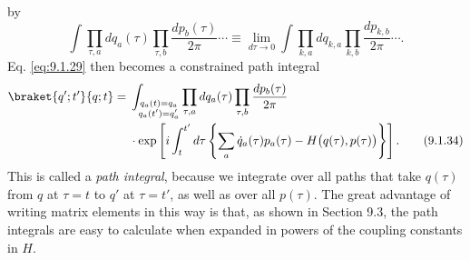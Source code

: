 by
\begin{equation}
  \int\prod_{\tau,a}dq_a(\tau)\prod_{\tau,b}\frac{dp_b(\tau)}{2\pi}\cdots
  \equiv\lim_{d\tau\to0}\int\prod_{k,a}dq_{k,a}
  \prod_{k,b}\frac{dp_{k,b}}{2\pi}\cdots.
  \tag{9.1.33}\label{eq:9.1.33}
\end{equation}
Eq. \eqref{eq:9.1.29} then becomes a constrained path integral
\begin{align}
  \braket{q';t'}{q;t}
  ={}&\int_{\substack{q_a(t)=q_a\\q_a(t')=q'_a}}
  \prod_{\tau,a}dq_a(\tau)\prod_{\tau,b}\frac{dp_b(\tau)}{2\pi}
  \notag\\
  &\cdot\exp\left[i\int_t^{t'}d\tau
  \left\{\sum_a\dot q_a(\tau)p_a(\tau)
  -H\bigl(q(\tau),p(\tau)\bigr)\right\}\right].
  \tag{9.1.34}\label{eq:9.1.34}
\end{align}
This is called a \emph{path integral}, because we integrate over all paths
that take $q(\tau)$ from $q$ at $\tau=t$ to $q'$ at $\tau=t'$, as well as
over all $p(\tau)$. The great advantage of writing matrix elements in this
way is that, as shown in Section 9.3, the path integrals are easy to calculate
when expanded in powers of the coupling constants in $H$.


